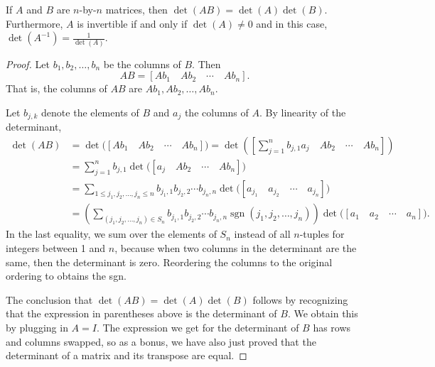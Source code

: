 \begin{prop}
If $A$ and $B$ are $n$-by-$n$ matrices, then $\det(AB) = \det(A)\det(B)$.
Furthermore, $A$ is invertible if and only if $\det(A) \not= 0$ and in
this case, $\det(A^{-1}) = \frac{1}{\det(A)}$.
\end{prop}

\begin{proof}
Let $b_1,b_2,\ldots,b_n$ be the columns of $B$.  Then
\begin{equation*}
AB = [ Ab_1 \quad Ab_2 \quad  \cdots \quad  Ab_n ] .
\end{equation*}
That is, the columns of $AB$ are
$Ab_1,Ab_2,\ldots,Ab_n$.

Let $b_{j,k}$ denote the elements of $B$ and
$a_j$ the columns of $A$.
By linearity of the determinant,
\begin{equation*}
\begin{split}
\det(AB) & =  
\det \bigl([ Ab_1 \quad Ab_2 \quad  \cdots \quad  Ab_n ] \bigr) =
\det \left(\left[ \sum_{j=1}^n b_{j,1} a_j \quad Ab_2 \quad  \cdots \quad  Ab_n \right]\right) \\
& =
\sum_{j=1}^n
b_{j,1}
\det \bigl([ a_j \quad Ab_2 \quad  \cdots \quad  Ab_n ]\bigr) \\
& =
\sum_{1 \leq j_1,j_2,\ldots,j_n \leq n}
b_{j_1,1}
b_{j_2,2}
\cdots
b_{j_n,n}
\det \bigl([ a_{j_1} \quad a_{j_2} \quad  \cdots \quad  a_{j_n} ]\bigr) \\
& =
\left(
\sum_{(j_1,j_2,\ldots,j_n) \in S_n}
b_{j_1,1}
b_{j_2,2}
\cdots
b_{j_n,n}
\operatorname{sgn}(j_1,j_2,\ldots,j_n)
\right)
\det \bigl([ a_{1} \quad a_{2} \quad  \cdots \quad  a_{n} ]\bigr) .
\end{split}
\end{equation*}
In the last equality, we sum over the elements of $S_n$
instead of all $n$-tuples for integers between 1 and $n$,
because
when two columns in the determinant are the same, then the
determinant is zero.  Reordering the columns to the
original ordering to obtains the sgn.

The conclusion that $\det(AB) = \det(A)\det(B)$
follows by recognizing that the expression in parentheses above is the determinant of $B$.  
We obtain this by plugging in $A=I$.
The expression we get for the determinant of $B$ has rows and columns
swapped, so as a bonus, we have also just proved that the determinant of
a matrix and its transpose are equal.


\end{proof}
